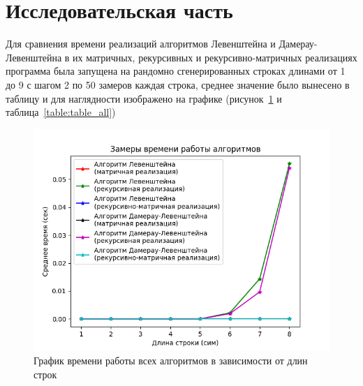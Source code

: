 \section{Исследовательская часть}

\hspace{1.25cm}
Для сравнения времени реализаций алгоритмов Левенштейна и Дамерау-Левенштейна в их матричных, рекурсивных и рекурсивно-матричных реализациях программа была запущена на рандомно сгенерированных строках длинами от 1 до 9 с шагом 2 по 50 замеров каждая строка, среднее значение было вынесено в таблицу и для наглядности изображено на графике (рисунок~\ref{fig:graph_all} и таблица~\ref{table:table_all})

\begin{figure}[H]
    \centering
    \includegraphics[width=1\textwidth]{img/graph_all.png}
    \caption{График времени работы всех алгоритмов в зависимости от длин строк}
    \label{fig:graph_all} %
\end{figure}

